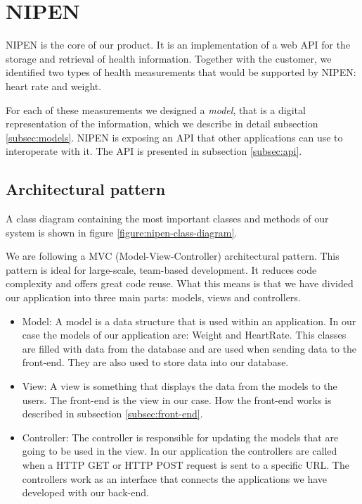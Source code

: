 \section{NIPEN}

NIPEN is the core of our product. 
It is an implementation of a web API for the storage and retrieval of health information.
Together with the customer, we identified two types of health measurements that would be supported by NIPEN: heart rate and weight.

For each of these measurements we designed a \textit{model}, that is a digital representation of the information, which we describe in detail subsection \ref{subsec:models}.
NIPEN is exposing an API that other applications can use to interoperate with it.
The API is presented in subsection \ref{subsec:api}.

\subsection{Architectural pattern}

A class diagram containing the most important classes and methods of our system is shown in figure \ref{figure:nipen-class-diagram}.

We are following a MVC (Model-View-Controller) architectural pattern. 
This pattern is ideal for large-scale, team-based development.
It reduces code complexity and offers great code reuse. 
What this means is that we have divided our application into three main parts: models, views and controllers.

\begin{itemize}

\item Model: A model is a data structure that is used within an application.
In our case the models of our application are: Weight and HeartRate.
This classes are filled with data from the database and are used when sending data to the front-end.
They are also used to store data into our database.

\item View: A view is something that displays the data from the models to the users.
The front-end is the view in our case.
How the front-end works is described in subsection \ref{subsec:front-end}.

\item Controller: The controller is responsible for updating the models that are going to be used in the view.
In our application the controllers are called when a HTTP GET or HTTP POST request is sent to a specific URL.
The controllers work as an interface that connects the applications we have developed with our back-end.

\end{itemize}


